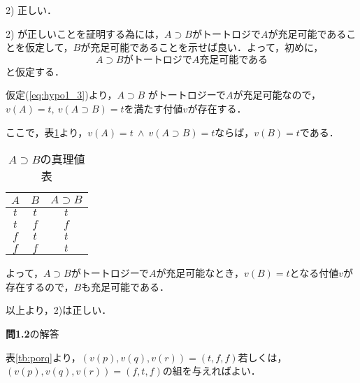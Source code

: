 \documentclass[11pt,dvipdfmx]{jreport}
\begin{document}
\vspace{5mm}
2) 正しい．
\par
2) が正しいことを証明する為には，$A \supset B$がトートロジで$A$が充足可能であることを仮定して，$B$が充足可能であることを示せば良い．よって，初めに，
\begin{equation}
 \textrm{$A \supset B$がトートロジで$A$充足可能である}
 \label{eq:hypo1_3}
\end{equation}
と仮定する．
\par
仮定(\ref{eq:hypo1_3})より，$A \supset B$ がトートロジーで$A$が充足可能なので，$v(A) = t, \ v(A \supset B) = t$を満たす付値$v$が存在する．
\par
ここで，表\ref{tb:imply}より，$v(A)=t \ \land \ v(A \supset B) = t$ならば，$v(B) = t$である．
\begin{table}[!htbp]
 \centering
   \caption{$A \supset B$の真理値表}
   \vspace{3mm}
   \begin{tabular}{c|c|c}
    $A$ & $B$ & $A \supset B$ \\ \hline
    $t$ & $t$ & $t$ \\ \hline
    $t$ & $f$ & $f$ \\ \hline
    $f$ & $t$ & $t$ \\ \hline
    $f$ & $f$ & $t$ 
   \end{tabular}
   \label{tb:imply}
\end{table}


よって，$A \supset B$がトートロジーで$A$が充足可能なとき，$v(B) = t$となる付値$v$が存在するので，$B$も充足可能である．
\par
以上より，2)は正しい．

\vspace{5mm}
\par

\noindent \textbf{問1.2}の解答
\par
表\ref{tb:porq}より，$(v(p), v(q), v(r)) = (t,f,f)$若しくは，$(v(p), v(q), v(r)) = (f,t,f)$の組を与えればよい．
\end{document}
